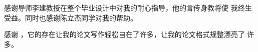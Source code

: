 \begin{acknowledgement}
  感谢导师李建教授在整个毕业设计中对我的耐心指导，他的言传身教将使
  我终生受益。同时也感谢陈立杰同学对我的帮助。

  感谢 \thuthesis，它的存在让我的论文写作轻松自在了许多，让我的论文格式规整漂亮了
  许多。
\end{acknowledgement}
